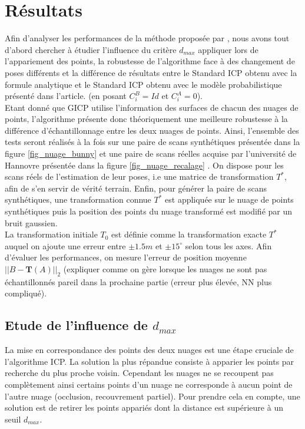 \section{Résultats}
Afin d'analyser les performances de la méthode proposée par \cite{bib_gicp}, nous avons tout d'abord chercher à étudier l'influence du critère $d_{max}$ appliquer lors de l'appariement des points, la robustesse de l'algorithme face à des changement de poses différents et la différence de résultats entre le Standard ICP obtenu avec la formule analytique et le Standard ICP obtenu avec le modèle probabilistique présenté dans l'article. (en posant $C_{i}^B=Id$ et $C_{i}^A=0$).\\

Etant donné que GICP utilise l'information des surfaces de chacun des nuages de points, l'algorithme présente donc théoriquement une meilleure robustesse à la différence d'échantillonnage entre les deux nuages de points. Ainsi, l'ensemble des tests seront réalisés à la fois sur une paire de scans synthétiques présentée dans la figure \ref{fig_nuage_bunny} et une paire de scans réelles acquise par l'université de Hannovre présentée dans la figure \ref{fig_nuage_recalage} . On dispose pour les scans réels de l'estimation de leur poses, i.e une matrice de transformation $T^*$, afin de s'en servir de vérité terrain. Enfin, pour générer la paire de scans synthétiques, une transformation connue $T^{*}$ est appliquée sur le nuage de points synthétiques puis la position des points du nuage transformé est modifié par un bruit gaussien.\\

La transformation initiale $T_0$ est définie comme la transformation exacte $T^*$ auquel on ajoute une erreur entre $\pm1.5m$ et $\pm15^{\circ}$ selon tous les axes. Afin d'évaluer les performances, on mesure l'erreur de position moyenne $||B - \mathbf{T}(A)||_2$ (expliquer comme on gère lorsque les nuages ne sont pas échantillonnés pareil dans la prochaine partie (erreur plus élevée, NN plus compliqué). 
\subsection{Etude de l'influence de $d_{max}$}
La mise en correspondance des points des deux nuages est une étape cruciale de l'algorithme ICP. La solution la plus répandue consiste à apparier les points par recherche du plus proche voisin. Cependant les nuages ne se recoupent pas complètement ainsi certains points d'un nuage ne corresponde à aucun point de l'autre nuage (occlusion, recouvrement partiel). Pour prendre cela en compte, une solution est de retirer les points appariés dont la distance est supérieure à un seuil $d_{max}$.\\

